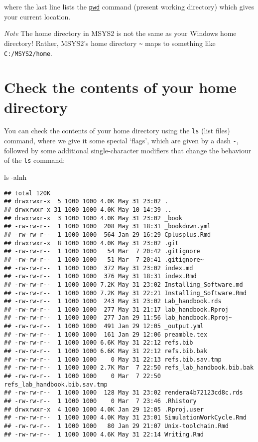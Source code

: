 \documentclass[
]{book}
\newenvironment{Shaded}{\begin{snugshade}}{\end{snugshade}}
\newcommand{\AttributeTok}[1]{\textcolor[rgb]{0.77,0.63,0.00}{#1}}
\newcommand{\FunctionTok}[1]{\textcolor[rgb]{0.00,0.00,0.00}{#1}}
\begin{document}
where the last line lists the \href{https://phoenixnap.com/kb/pwd-linux}{\texttt{pwd}} command (present working directory) which gives your current location.

\emph{Note} The home directory in MSYS2 is not the same as your Windows home directory! Rather, MSYS2's home directory \texttt{\textasciitilde{}} maps to something like \texttt{C:/MSYS2/home}.

\hypertarget{check-the-contents-of-your-home-directory}{%
\section{Check the contents of your home directory}\label{check-the-contents-of-your-home-directory}}

You can check the contents of your home directory using the \texttt{ls} (list files) command, where we give it some special `flags', which are given by a dash \texttt{-}, followed by some additional single-character modifiers that change the behaviour of the \texttt{ls} command:

\begin{Shaded}
\begin{Highlighting}[]
\FunctionTok{ls} \AttributeTok{{-}alnh}
\end{Highlighting}
\end{Shaded}

\begin{verbatim}
## total 120K
## drwxrwxr-x  5 1000 1000 4.0K May 31 23:02 .
## drwxrwxr-x 31 1000 1000 4.0K May 10 14:39 ..
## drwxrwxr-x  3 1000 1000 4.0K May 31 23:02 _book
## -rw-rw-r--  1 1000 1000  208 May 31 18:31 _bookdown.yml
## -rw-rw-r--  1 1000 1000  564 Jan 29 16:29 Cplusplus.Rmd
## drwxrwxr-x  8 1000 1000 4.0K May 31 23:02 .git
## -rw-rw-r--  1 1000 1000   54 Mar  7 20:42 .gitignore
## -rw-rw-r--  1 1000 1000   51 Mar  7 20:41 .gitignore~
## -rw-rw-r--  1 1000 1000  372 May 31 23:02 index.md
## -rw-rw-r--  1 1000 1000  376 May 31 18:31 index.Rmd
## -rw-rw-r--  1 1000 1000 7.2K May 31 23:02 Installing_Software.md
## -rw-rw-r--  1 1000 1000 7.2K May 31 22:21 Installing_Software.Rmd
## -rw-rw-r--  1 1000 1000  243 May 31 23:02 Lab_handbook.rds
## -rw-rw-r--  1 1000 1000  277 May 31 21:17 lab_handbook.Rproj
## -rw-rw-r--  1 1000 1000  277 Jan 29 11:56 lab_handbook.Rproj~
## -rw-rw-r--  1 1000 1000  491 Jan 29 12:05 _output.yml
## -rw-rw-r--  1 1000 1000  161 Jan 29 12:06 preamble.tex
## -rw-rw-r--  1 1000 1000 6.6K May 31 22:12 refs.bib
## -rw-rw-r--  1 1000 1000 6.6K May 31 22:12 refs.bib.bak
## -rw-rw-r--  1 1000 1000    0 May 31 22:13 refs.bib.sav.tmp
## -rw-rw-r--  1 1000 1000 2.7K Mar  7 22:50 refs_lab_handbook.bib.bak
## -rw-rw-r--  1 1000 1000    0 Mar  7 22:50 refs_lab_handbook.bib.sav.tmp
## -rw-rw-r--  1 1000 1000  128 May 31 23:02 rendera4b72123cd8c.rds
## -rw-rw-r--  1 1000 1000    0 Mar  7 23:46 .Rhistory
## drwxrwxr-x  4 1000 1000 4.0K Jan 29 12:05 .Rproj.user
## -rw-rw-r--  1 1000 1000 4.0K May 31 23:01 SimulationWorkCycle.Rmd
## -rw-rw-r--  1 1000 1000   80 Jan 29 21:07 Unix-toolchain.Rmd
## -rw-rw-r--  1 1000 1000 4.6K May 31 22:14 Writing.Rmd
\end{verbatim}
\end{document}
